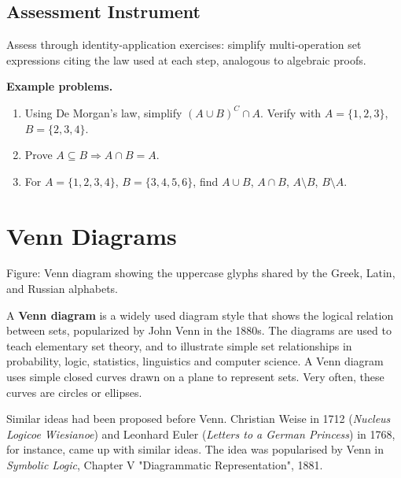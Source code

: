 \subsection{Assessment Instrument}
\label{ssec:asse-3669}


Assess through identity-application exercises: simplify multi-operation
set expressions citing the law used at each step, analogous to algebraic
proofs.

\textbf{Example problems.}
\begin{enumerate}
    \item Using De Morgan's law, simplify $(A\cup B)^C\cap A$.
          Verify with $A=\{1,2,3\}$, $B=\{2,3,4\}$.
    \item Prove $A\subseteq B \Rightarrow A\cap B=A$.
    \item For $A=\{1,2,3,4\}$, $B=\{3,4,5,6\}$, find
          $A\cup B$, $A\cap B$, $A\setminus B$, $B\setminus A$.
\end{enumerate}



\section{Venn Diagrams}
\label{sec:venn-9120}





Figure: Venn diagram showing the uppercase glyphs shared by the Greek, Latin, and Russian alphabets.



A \textbf{Venn diagram} is a widely used diagram style that shows the logical relation
between sets, popularized by John Venn in the 1880s. The diagrams are used to teach
elementary set theory, and to illustrate simple set relationships in probability, logic,
statistics, linguistics and computer science. A Venn diagram uses simple closed curves
drawn on a plane to represent sets. Very often, these curves are circles or ellipses.



Similar ideas had been proposed before Venn. Christian Weise in 1712 (\textit{Nucleus
Logicoe Wiesianoe}) and Leonhard Euler (\textit{Letters to a German Princess}) in 1768,
for instance, came up with similar ideas. The idea was popularised by Venn in
\textit{Symbolic Logic}, Chapter V "Diagrammatic Representation", 1881.




